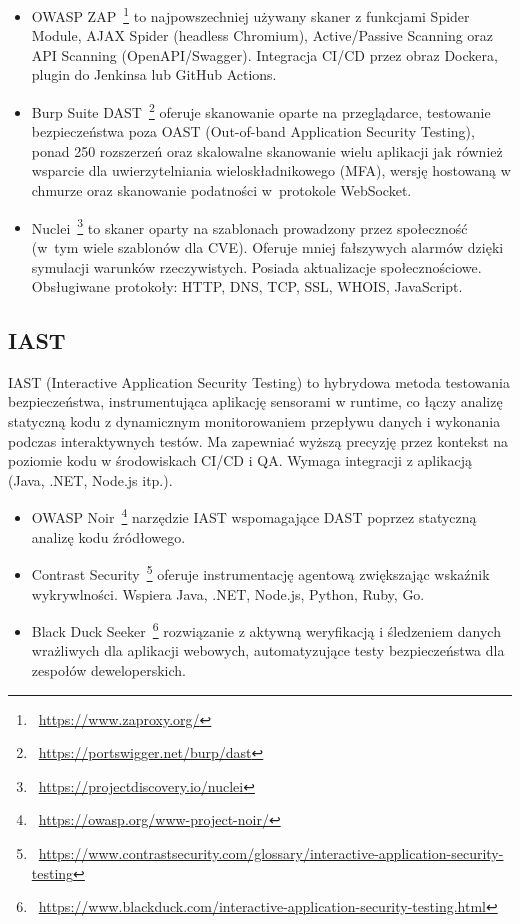 \begin{itemize}
\item OWASP ZAP~\footnote{~\url{https://www.zaproxy.org/}} to najpowszechniej używany skaner z funkcjami Spider Module, AJAX Spider (headless Chromium), Active/Passive Scanning oraz API Scanning (OpenAPI/Swagger). Integracja CI/CD przez obraz Dockera, plugin do Jenkinsa lub GitHub Actions. 

\item Burp Suite DAST~\footnote{~\url{https://portswigger.net/burp/dast}} oferuje skanowanie oparte na przeglądarce, testowanie bezpieczeństwa poza OAST (Out-of-band Application Security Testing), ponad 250 rozszerzeń oraz skalowalne skanowanie wielu aplikacji jak również wsparcie dla uwierzytelniania wieloskładnikowego (MFA), wersję hostowaną w chmurze oraz skanowanie podatności w~protokole WebSocket.

\item Nuclei~\footnote{~\url{https://projectdiscovery.io/nuclei}} to skaner oparty na szablonach prowadzony przez społeczność (w~tym wiele szablonów dla CVE). Oferuje mniej fałszywych alarmów dzięki symulacji warunków rzeczywistych. Posiada aktualizacje społecznościowe. Obsługiwane protokoły: HTTP, DNS, TCP, SSL, WHOIS, JavaScript.
\end{itemize}

\subsection{IAST}

IAST (Interactive Application Security Testing) to hybrydowa metoda testowania bezpieczeństwa, instrumentująca aplikację sensorami w runtime, co łączy analizę statyczną kodu z dynamicznym monitorowaniem przepływu danych i wykonania podczas interaktywnych testów. Ma zapewniać wyższą precyzję przez kontekst na poziomie kodu w środowiskach CI/CD i QA. Wymaga integracji z aplikacją (Java, .NET, Node.js itp.).

\begin{itemize}
    \item OWASP Noir~\footnote{~\url{https://owasp.org/www-project-noir/}} narzędzie IAST wspomagające DAST poprzez statyczną analizę kodu źródłowego.

\item Contrast Security~\footnote{~\url{https://www.contrastsecurity.com/glossary/interactive-application-security-testing}} oferuje instrumentację agentową zwiększając wskaźnik wykrywlności. Wspiera Java, .NET, Node.js, Python, Ruby, Go.

\item Black Duck Seeker~\footnote{~\url{https://www.blackduck.com/interactive-application-security-testing.html}} rozwiązanie z aktywną weryfikacją i śledzeniem danych wrażliwych dla aplikacji webowych, automatyzujące testy bezpieczeństwa dla zespołów deweloperskich.
\end{itemize}

